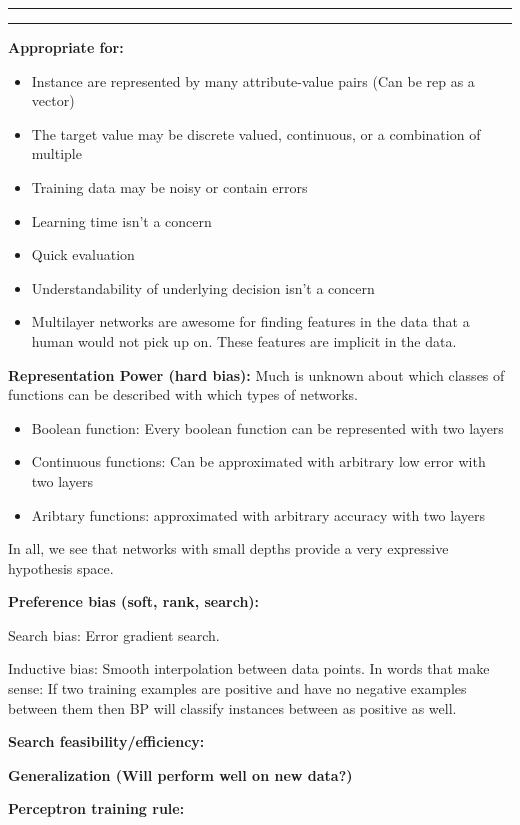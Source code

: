 \documentclass[11pt]{article}
\newcounter{questionCounter}
\newcounter{partCounter}[questionCounter]
\newenvironment{question}[2][\arabic{questionCounter}]{%
    \addtocounter{questionCounter}{1}%
    \setcounter{partCounter}{0}%
    \vspace{.25in} \hrule \vspace{0.5em}%
        \noindent{\bf #1: #2}%
    \vspace{0.8em} \hrule \vspace{.10in}%
}{}
\begin{document}
\begin{question}{Nueral Nets: }

\textbf{Appropriate for:}

\begin{itemize}
    \item Instance are represented by many attribute-value pairs (Can be rep as a vector) 
    \item The target value may be discrete valued, continuous, or a combination of multiple
    \item Training data may be noisy or contain errors
    \item Learning time isn't a concern
    \item Quick evaluation
    \item Understandability of underlying decision isn't a concern
    \item Multilayer networks are awesome for finding features in the data that a human would not pick up on. These
    features are implicit in the data.
\end{itemize}

\textbf{Representation Power (hard bias):}
Much is unknown about which classes of functions can be described with which types of networks.

\begin{itemize}
    \item Boolean function: Every boolean function can be represented with  two layers
    \item Continuous functions: Can be approximated with arbitrary low error with two layers
    \item Aribtary functions: approximated with arbitrary accuracy with two layers
\end{itemize}

In all, we see that networks with small depths provide a very expressive hypothesis space.

\textbf{Preference bias (soft, rank, search):}

Search bias: Error gradient search.

Inductive bias: Smooth interpolation between data points. In words that make sense: If two training
examples are positive and have no negative examples between them then BP will classify instances
between as positive as well.

\textbf{Search feasibility/efficiency:}

\textbf{Generalization (Will perform well on new data?)}

\textbf{Perceptron training rule:}


\end{question}
\end{document}
